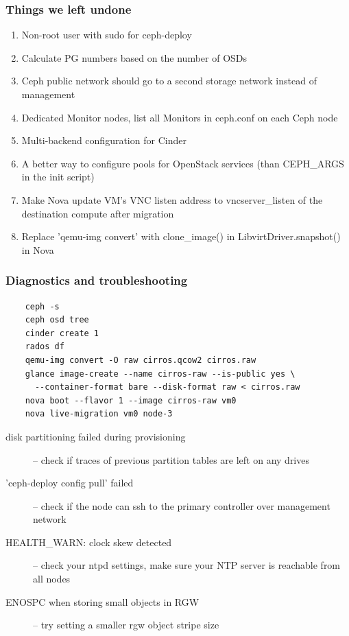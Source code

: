 \documentclass[hyperref=unicode,utf8,xcolor=pst]{beamer}
\begin{document}
\begin{frame}
	\frametitle{Things we left undone}
	\begin{enumerate}
		\item Non-root user with sudo for ceph-deploy
		\item Calculate PG numbers based on the number of OSDs
		\item Ceph public network should go to a second storage
			network instead of management
		\item Dedicated Monitor nodes, list all Monitors in
			ceph.conf on each Ceph node
		\item Multi-backend configuration for Cinder
		\item A better way to configure pools for OpenStack
			services (than CEPH\_ARGS in the init script)
		\item Make Nova update VM's VNC listen address to
			vncserver\_listen of the destination compute
			after migration
		\item Replace 'qemu-img convert' with clone\_image() in
			LibvirtDriver.snapshot() in Nova
	\end{enumerate}
\end{frame}

\begin{frame}[fragile]
	\frametitle{Diagnostics and troubleshooting}
	\lstset{language=bash,basicstyle=\ttfamily\footnotesize}

	\begin{lstlisting}
	ceph -s
	ceph osd tree
	cinder create 1
	rados df
	qemu-img convert -O raw cirros.qcow2 cirros.raw
	glance image-create --name cirros-raw --is-public yes \
	  --container-format bare --disk-format raw < cirros.raw
	nova boot --flavor 1 --image cirros-raw vm0
	nova live-migration vm0 node-3
	\end{lstlisting}

	\begin{description}
		\item[disk partitioning failed during provisioning] --
			check if traces of previous partition tables are
			left on any drives
		\item['ceph-deploy config pull' failed] -- check if the
			node can ssh to the primary controller over
			management network
		\item[HEALTH\_WARN: clock skew detected] -- check your
			ntpd settings, make sure your NTP server is
			reachable from all nodes
		\item[ENOSPC when storing small objects in RGW] -- try
			setting a smaller rgw object stripe size
	\end{description}
\end{frame}
\end{document}
